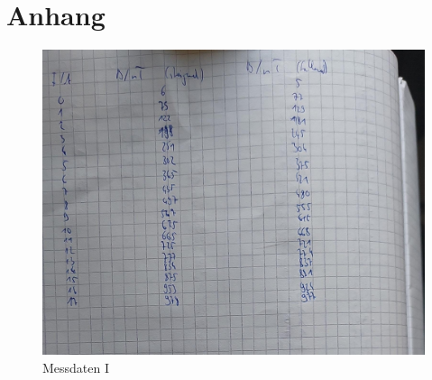 \newpage
\section{Anhang}
\label{sec:anhang}
\begin{figure}[h!]
  \centering
  \includegraphics[scale=0.3]{fig/mess3.jpeg}
  \caption{Messdaten I}
  \label{abb:mess1}
\end{figure}
